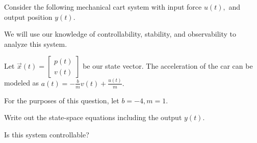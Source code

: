 
Consider the following mechanical cart system with input force $u(t),$ and output position $y(t).$




We will use our knowledge of controllability, stability, and observability to analyze this system.

Let $\vec{x}(t) = \begin{bmatrix} p(t) \\ v(t) \end{bmatrix}$ be our state vector. 
The acceleration of the car can be modeled as $a(t) = -\frac{b}{m} v(t) + \frac{u(t)}{m}.$

For the purposes of this question, let $b = -4, m = 1.$

\begin{enumerate}
  \qitem Write out the state-space equations including the output $y(t).$


  \qitem Is this system controllable?



\end{enumerate}
